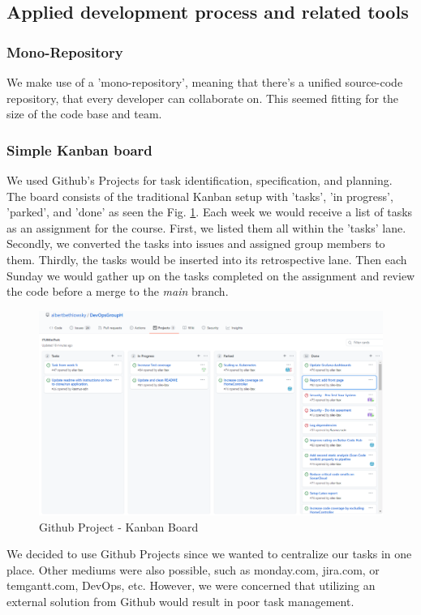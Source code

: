 \documentclass{article}
\begin{document}
\subsection{Applied development process and related tools}
\subsubsection*{Mono-Repository}
 We make use of a 'mono-repository', meaning that there's a unified source-code repository, that every developer can collaborate on. This seemed fitting for the size of the code base and team.

\subsubsection*{Simple Kanban board}
We used Github's Projects for task identification, specification, and planning. The board consists of the traditional Kanban setup with 'tasks', 'in progress', 'parked', and 'done' as seen the Fig. \ref{fig:kanban}. Each week we would receive a list of tasks as an assignment for the course. First, we listed them all within the 'tasks' lane. Secondly, we converted the tasks into issues and assigned group members to them. Thirdly, the tasks would be inserted into its retrospective lane. Then each Sunday we would gather up on the tasks completed on the assignment and review the code before a merge to the \textit{main} branch.

\begin{figure}[H]
\centering
\includegraphics[width=1\textwidth]{images/kanban.png}
\caption{\label{fig:kanban} Github Project - Kanban Board}
\end{figure}
We decided to use Github Projects since we wanted to centralize our tasks in one place. Other mediums were also possible, such as monday.com, jira.com, or temgantt.com, DevOps, etc. However, we were concerned that utilizing an external solution from Github would result in poor task management.
\end{document}
